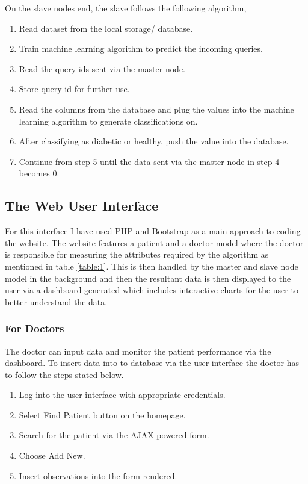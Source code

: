 \documentclass[12pt]{article}
\begin{document}
On the slave nodes end, the slave follows the following algorithm, 
\begin{enumerate}
\item Read dataset from the local storage/ database.
\item Train machine learning algorithm to predict the incoming queries.
\item Read the query ids sent via the master node.
\item Store query id for further use.
\item Read the columns from the database and plug the values into the machine learning algorithm to generate  classifications on.
\item After classifying as diabetic or healthy, push the value into the database.
\item Continue from step 5 until the data sent via the master node in step 4 becomes 0.
\end{enumerate}


\subsection{The Web User Interface}
For this interface I have used PHP and Bootstrap as a main approach to coding the website. The website features a patient and a doctor model where the doctor is responsible for measuring the attributes required by the algorithm as mentioned in table \ref{table:1}. This is then handled by the master and slave node model in the background and then the resultant data is then displayed to the user via a dashboard generated which includes interactive charts for the user to better understand the data.

\subsubsection{For Doctors}
The doctor can input data and monitor the patient performance via the dashboard. To insert data into to database via the user interface the doctor has to follow the steps stated below.
\begin{enumerate}
\item Log into the user interface with appropriate credentials.
\item Select Find Patient button on the homepage.
\item Search for the patient via the AJAX powered form.
\item Choose Add New.
\item Insert observations into the form rendered.
\end{enumerate}
\end{document}
